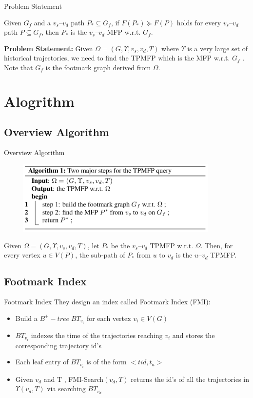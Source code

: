 \documentclass[mathserif]{beamer}
\begin{document}
\begin{frame}{Problem Statement}
\begin{defination}[MPF]
Given $G_f$ and a $v_s–v_d$ path $P_* \subseteq{} G_f$, if $F(P_*) \succeq{} F(P)$ holds for every $v_s–v_d$ path $P \subseteq{} G_f$, then $P_*$ is the $v_s–v_d$ MFP w.r.t. $G_f$.
\end{defination}
\textbf{Problem Statement:} Given $\Omega{} = (G, \Upsilon{}, v_s, v_d, T )$ where $\Upsilon{}$ is a very large set of historical trajectories, we need to find the TPMFP which is the MFP w.r.t. $G_f$ . Note that $G_f$ is the footmark graph derived from $\Omega$.
\end{frame}

\section{Alogrithm}
\subsection{Overview Algorithm}

\begin{frame}{Overview Algorithm}
\begin{figure}
\includegraphics[width = 10cm]{alg1.png}
\end{figure}
\begin{theore}
Given $\Omega{} = (G, \Upsilon{}, v_s, v_d, T )$, let $P_*$ be the $v_s–v_d$ TPMFP w.r.t. $\Omega$. Then, for every vertex $u \in{} V (P )$, the sub-path of $P_*$ from $u$ to $v_d$ is the $u–v_d$ TPMFP.
\end{theore}
\end{frame}

\subsection[FMI]{Footmark Index}
\begin{frame}{Footmark Index}
They design an index called Footmark Index (FMI):
\begin{itemize}
\item Build a $B^+ - tree \; BT_{v_i}$ for each vertex $v_i \in{} V (G)$
\item $BT_{v_i}$ indexes the time of the trajectories reaching $v_i$ and stores the corresponding trajectory id’s
\item Each leaf entry of $BT_{v_i}$ is of the form $<tid,t_a>$
\item Given $v_d$ and T , FMI-Search$(v_d , T )$ returns the id’s of all the trajectories in $\Upsilon{}(v_d,T )$ via searching $BT_{v_d}$
\end{itemize}
\end{frame}
\end{document}
